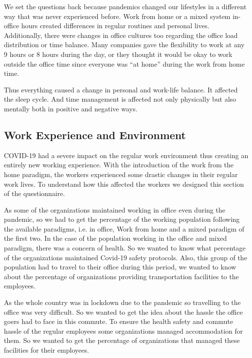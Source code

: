 \documentclass[11pt]{article}
\begin{document}
We set the questions back because pandemics changed our lifestyles in a different way that was never experienced before. Work from home or a mixed system in-office hours created differences in regular routines and personal lives. 
Additionally, there were changes in office cultures too regarding the office load distribution or time balance. Many companies gave the flexibility to work at any 9 hours or 8 hours during the day, or they thought it would be okay to work outside the office time since everyone was “at home” during the work from home time.

Thus everything caused a change in personal and work-life balance. It affected the sleep cycle. And time management is affected not only physically but also mentally both in positive and negative ways.

\subsection {Work Experience and Environment}

COVID-19 had a severe impact on the regular work environment thus creating an entirely new working experience. With the introduction of the work from the home paradigm, the workers experienced some drastic changes in their regular work lives. To understand how this affected the workers we designed this section of the questionnaire.

As some of the organizations maintained working in office even during the pandemic, so we had to get the percentage of the working population following the available paradigms, i.e. in office, Work from home and a mixed paradigm of the first two. 
In the case of the population working in the office and mixed paradigm, there was a concern of health. So we wanted to know what percentage of the organizations maintained Covid-19 safety protocols. Also, this group of the population had to travel to their office during this period, we wanted to know about the percentage of organizations providing transportation facilities to the employees. 

As the whole country was in lockdown due to the pandemic so travelling to the office was very difficult. So we wanted to get the idea about the hassle the office goers had to face in this commute. To ensure the health safety and commute hassle of the regular employees some organizations managed accommodation for them. So we wanted to get the percentage of organizations that managed these facilities for their employees.
\end{document}
